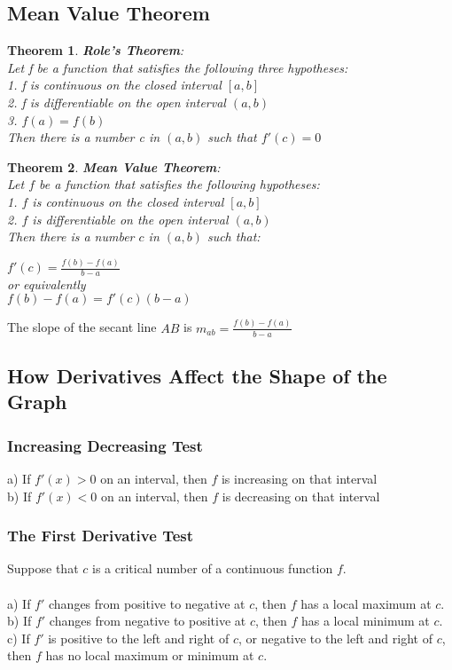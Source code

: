 \documentclass[10pt,a4paper]{article}
\newtheorem{theorem}{Theorem}
\begin{document}
\subsection{Mean Value Theorem}
\begin{theorem}
	\textbf{Role's Theorem}:
	\\Let \textit{f} be a function that satisfies the following three hypotheses:
	\\1. \textit{f} is continuous on the closed interval $[a,b]$
	\\2. \textit{f} is differentiable on the open interval $(a,b)$
	\\3. $f(a) = f(b)$
	\\ Then there is a number \textit{c} in $(a,b)$ such that $f'(c)=0$	
\end{theorem}
\begin{theorem}
	\textbf{Mean Value Theorem}:
	\\Let $f$ be a function that satisfies the following hypotheses:
	\\1. $f$ is continuous on the closed interval $[a,b]$
	\\2. $f$ is differentiable on the open interval $(a,b)$
	\\ Then there is a number $c$ in $(a,b)$ such that:
	\begin{center}
		$f'(c)= \frac{f(b)-f(a)}{b-a}$
		\\or equivalently
		\\$f(b)-f(a) = f'(c)(b-a)$
	\end{center}
\end{theorem}
The slope of the secant line $AB$ is $m_{ab}=\frac{f(b)-f(a)}{b-a}$

\subsection{How Derivatives Affect the Shape of the Graph}
\subsubsection{Increasing Decreasing Test}
a) If $f'(x) > 0$ on an interval, then $f$ is increasing on that interval
\\b) If $f'(x) < 0 $ on an interval, then $f$ is decreasing on that interval

\subsubsection{The First Derivative Test}
Suppose that $c$ is a critical number of a continuous function $f$.
\\
\\ a) If $f'$ changes from positive to negative at $c$, then $f$ has a local maximum at $c$.
\\ b) If $f'$ changes from negative to positive at $c$, then $f$ has a local minimum at $c$.
\\ c) If $f'$ is positive to the left and right of $c$, or negative to the left and right of $c$, then $f$ has no local maximum or minimum at $c$.
\end{document}
